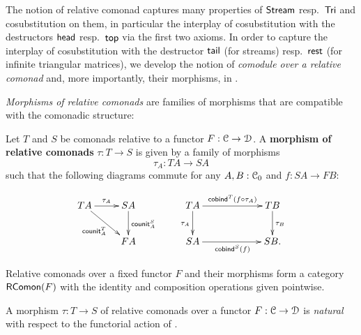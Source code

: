 \documentclass[a4paper,USenglish]{lipics}
\newcommand{\fat}[1]{\textbf{#1}}
\begin{document}
The notion of relative comonad captures many properties of $\mathsf{Stream}$ resp.\ $\mathsf{Tri}$ and cosubstitution on them, in particular the interplay
of cosubstitution with the destructors $\mathsf{head}$ resp.\ $\mathsf{top}$ via the first two axioms.
In order to  capture the interplay 
of cosubstitution  with the destructor $\mathsf{tail}$ (for streams) resp.\ $\mathsf{rest}$ (for infinite triangular matrices), 
we develop the notion of \emph{comodule over a relative comonad} and, more importantly, their morphisms, in . 








\emph{Morphisms of relative comonads} are families of morphisms that are compatible with the comonadic structure:

\begin{defn}%
\label{def:comonad_morphism}
 Let $T$ and $S$ be comonads relative to a functor $F : {\mathcal{C}} \to \mathcal{D}$. A \fat{morphism of relative comonads} $\tau : T \to S$
  is given by a family of morphisms \[\tau_A : TA \to SA\] such that the following diagrams commute
  for any  $A,B : {\mathcal{C}}_0$ and $f : SA\to FB$:
     
\[ \begin{xy}
    \xymatrix {
                       TA \ar[r]^{\tau_A} \ar[rd]_{\counit^T_A}  &   SA \ar[d]^{\counit^S_A}\\
                            &    FA
   }
   \end{xy}
% 
% 
%   
% 
\qquad
\begin{xy}
     \xymatrix@C=6em{
                     TA \ar[d]_{\tau_A}   \ar[r]^{\cobind^T(\comp{\tau_A}{f})} & TB \ar[d]^{\tau_B}\\
                     SA \ar[r]_{\cobind^S(f)} & SB .
     }  
   \end{xy}
\]

\end{defn}

\noindent
Relative comonads over a fixed functor $F$ and their morphisms form a category $\mathsf{RComon}(F)$ with the identity and composition operations given pointwise.

\begin{rem}
A morphism $\tau : T\to S$ of relative comonads over a functor $F:{\mathcal{C}}\to\mathcal{D}$ is  \emph{natural}
with respect to the functorial action of .
\end{rem}
\end{document}
